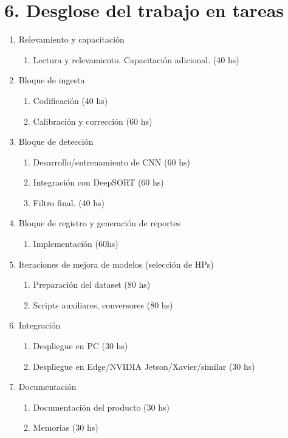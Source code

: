 \documentclass[11pt]{charter}
\begin{document}
\section{6. Desglose del trabajo en tareas}
\label{sec:wbs}

\begin{enumerate}
\item Relevamiento y capacitación
	\begin{enumerate}
	\item Lectura y relevamiento. Capacitación adicional. (40 hs)
	\end{enumerate}
\item Bloque de ingesta
	\begin{enumerate}
	\item Codificación (40 hs)
	\item Calibración y corrección (60 hs)
	\end{enumerate}
\item Bloque de detección
	\begin{enumerate}
	\item Desarrollo/entrenamiento de CNN (60 hs)
	\item Integración con DeepSORT (60 hs)
	\item Filtro final. (40 hs)
	\end{enumerate}
\item Bloque de registro y generación de reportes
	\begin{enumerate}
	\item Implementación (60hs)
	\end{enumerate}
\item Iteraciones de mejora de modelos (selección de HPs)
	\begin{enumerate}
	\item Preparación del dataset (80 hs)
	\item Scripts auxiliares, conversores (80 hs)
	\end{enumerate}
\item Integración
	\begin{enumerate}
	\item Despliegue en PC (30 hs)
	\item Despliegue en Edge/NVIDIA Jetson/Xavier/similar (30 hs)
	\end{enumerate}	
\item Documentación
	\begin{enumerate}
	\item Documentación del producto (30 hs)
	\item Memorias (30 hs)
	\end{enumerate}		
\end{enumerate}
\end{document}
